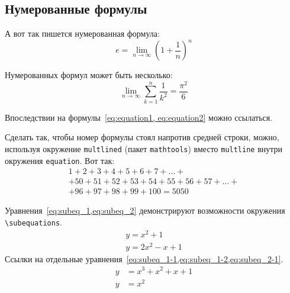 \subsection{Нумерованные формулы}\label{subsec:ch1/sec3/sub3}

А вот так пишется нумерованная формула:
\begin{equation}
    \label{eq:equation1}
    e = \lim_{n \to \infty} \left( 1+\frac{1}{n} \right) ^n
\end{equation}

Нумерованных формул может быть несколько:
\begin{equation}
    \label{eq:equation2}
    \lim_{n \to \infty} \sum_{k=1}^n \frac{1}{k^2} = \frac{\pi^2}{6}
\end{equation}

Впоследствии на формулы~\cref{eq:equation1, eq:equation2} можно ссылаться.

Сделать так, чтобы номер формулы стоял напротив средней строки, можно,
используя окружение \verb|multlined| (пакет \verb|mathtools|) вместо
\verb|multline| внутри окружения \verb|equation|. Вот так:
\begin{equation} %
    \label{eq:equation3}
    \begin{multlined}
        1+ 2+3+4+5+6+7+\dots + \\
        + 50+51+52+53+54+55+56+57 + \dots + \\
        + 96+97+98+99+100=5050
    \end{multlined}
\end{equation}

Уравнения~\cref{eq:subeq_1,eq:subeq_2} демонстрируют возможности
окружения \verb|\subequations|.
\begin{subequations}
    \label{eq:subeq_1}
    \begin{gather}
        y = x^2 + 1 \label{eq:subeq_1-1} \\
        y = 2 x^2 - x + 1 \label{eq:subeq_1-2}
    \end{gather}
\end{subequations}
Ссылки на отдельные уравнения~\cref{eq:subeq_1-1,eq:subeq_1-2,eq:subeq_2-1}.
\begin{subequations}
    \label{eq:subeq_2}
    \begin{align}
        y & = x^3 + x^2 + x + 1 \label{eq:subeq_2-1} \\
        y & = x^2
    \end{align}
\end{subequations}

